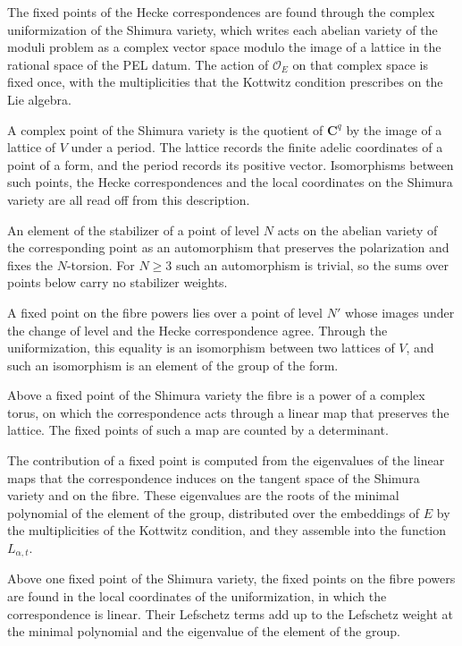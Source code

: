 The fixed points of the Hecke correspondences are found through the complex uniformization of the
Shimura variety, which writes each abelian variety of the moduli problem as a complex vector space
modulo the image of a lattice in the rational space of the PEL datum. The action of $\mathcal O_E$ on
that complex space is fixed once, with the multiplicities that the Kottwitz condition prescribes on the
Lie algebra.

A complex point of the Shimura variety is the quotient of $\mathbf C^q$ by the image of a lattice of $V$
under a period. The lattice records the finite adelic coordinates of a point of a form, and the period
records its positive vector. Isomorphisms between such points, the Hecke correspondences and the local
coordinates on the Shimura variety are all read off from this description.

An element of the stabilizer of a point of level $N$ acts on the abelian variety of the corresponding
point as an automorphism that preserves the polarization and fixes the $N$-torsion. For $N\geq3$ such an
automorphism is trivial, so the sums over points below carry no stabilizer weights.

A fixed point on the fibre powers lies over a point of level $N'$ whose images under the change of level
and the Hecke correspondence agree. Through the uniformization, this equality is an isomorphism between
two lattices of $V$, and such an isomorphism is an element of the group of the form.

Above a fixed point of the Shimura variety the fibre is a power of a complex torus, on which the
correspondence acts through a linear map that preserves the lattice. The fixed points of such a map are
counted by a determinant.

The contribution of a fixed point is computed from the eigenvalues of the linear maps that the
correspondence induces on the tangent space of the Shimura variety and on the fibre. These eigenvalues
are the roots of the minimal polynomial of the element of the group, distributed over the embeddings of
$E$ by the multiplicities of the Kottwitz condition, and they assemble into the function $L_{\alpha,t}$.

Above one fixed point of the Shimura variety, the fixed points on the fibre powers are found in the
local coordinates of the uniformization, in which the correspondence is linear. Their Lefschetz terms
add up to the Lefschetz weight at the minimal polynomial and the eigenvalue of the element of the group.

